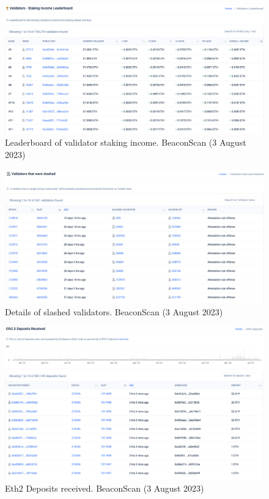 \documentclass[UTF8]{article}
\begin{document}
\begin{figure}[htbp]
\begin{center}
\includegraphics[width=\linewidth]{images/beaconscan5}
\caption{Leaderboard of validator staking income. BeaconScan (3 August 2023)}
\label{fig:beaconscan5}
\end{center}
\end{figure}

\begin{figure}[htbp]
\begin{center}
\includegraphics[width=\linewidth]{images/beaconscan6}
\caption{Details of slashed validators. BeaconScan (3 August 2023)}
\label{fig:beaconscan6}
\end{center}
\end{figure}

\begin{figure}[htbp]
\begin{center}
\includegraphics[width=\linewidth]{images/beaconscan7}
\caption{Eth2 Deposits received. BeaconScan (3 August 2023)}
\label{fig:beaconscan7}
\end{center}
\end{figure}
\end{document}
